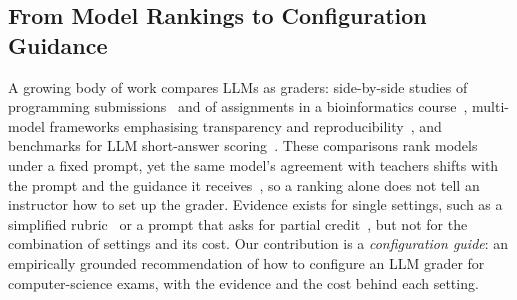 \subsection{From Model Rankings to Configuration Guidance}
A growing body of work compares LLMs as graders: side-by-side studies of programming
submissions~\cite{jukiewicz_comparison_2026} and of assignments in a bioinformatics
course~\cite{policar_automated_2025}, multi-model frameworks emphasising transparency and
reproducibility~\cite{anghel_graderassist_2025}, and benchmarks for LLM short-answer
scoring~\cite{lai_sasbench_2026}. These comparisons rank models under a fixed prompt, yet the same model's
agreement with teachers shifts with the prompt and the guidance it receives~\cite{tate_can_2024,pathak_rubric_2025},
so a ranking alone does not tell an instructor how to set up the grader. Evidence exists for single settings, such
as a simplified rubric~\cite{yoshida_detailed_2025} or a prompt that asks for partial
credit~\cite{sapkota_math_2026}, but not for the combination of settings and its cost. Our contribution is a
\emph{configuration guide}: an empirically grounded recommendation of how to configure an LLM grader for
computer-science exams, with the evidence and the cost behind each setting.

